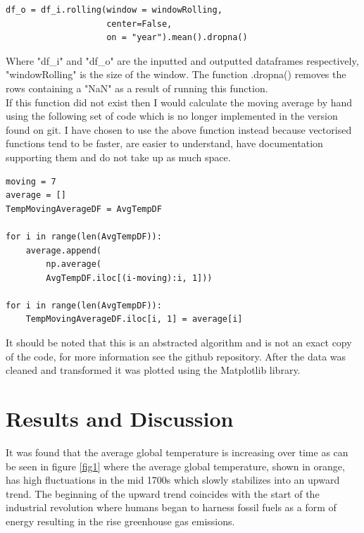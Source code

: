 \documentclass[journal, a4paper]{IEEEtran}
\begin{document}
    \begin{small}
    \begin{lstlisting}
df_o = df_i.rolling(window = windowRolling,
                    center=False,
                    on = "year").mean().dropna()
    \end{lstlisting}
    \end{small}

    Where "df\_i" and "df\_o" are the inputted and outputted dataframes respectively, "windowRolling" is the size of the window. The function .dropna() removes the rows containing a "NaN" as a result of running this function.\\

    If this function did not exist then I would calculate the moving average by hand using the following set of code which is no longer implemented in the version found on git. I have chosen to use the above function instead because vectorised functions tend to be faster, are easier to understand, have documentation supporting them and do not take up as much space.

    \begin{small}
    \begin{lstlisting}
moving = 7
average = []
TempMovingAverageDF = AvgTempDF

for i in range(len(AvgTempDF)):
    average.append(
    	np.average(
        AvgTempDF.iloc[(i-moving):i, 1]))

for i in range(len(AvgTempDF)):
	TempMovingAverageDF.iloc[i, 1] = average[i]
    \end{lstlisting}
    \end{small}

    It should be noted that this is an abstracted algorithm and is not an exact copy of the code, for more information see the github repository. After the data was cleaned and transformed it was plotted using the Matplotlib library.

\section{Results and Discussion}

	It was found that the average global temperature is increasing over time as can be seen in figure \ref{fig1} where the average global temperature, shown in orange, has high fluctuations in the mid 1700s which slowly stabilizes into an upward trend. The beginning of the upward trend coincides with the start of the industrial revolution where humans began to harness fossil fuels as a form of energy resulting in the rise greenhouse gas emissions.\\
\end{document}
